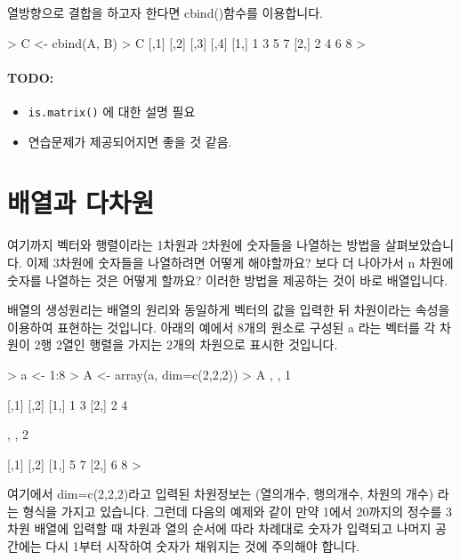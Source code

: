 \documentclass[tutorial.tex]{subfiles}
\begin{document}
열방향으로 결합을 하고자 한다면 cbind()함수를 이용합니다. 

\begin{Schunk}
\begin{Soutput}
> C <- cbind(A, B)
> C
     [,1] [,2] [,3] [,4]
[1,]    1    3    5    7
[2,]    2    4    6    8
> 
\end{Soutput}
\end{Schunk}

\paragraph{TODO:}
\begin{itemize}
	\item \texttt{is.matrix()} 에 대한 설명 필요
	\item 연습문제가 제공되어지면 좋을 것 같음. 
\end{itemize}

%
%
%

\section{배열과 다차원} 

여기까지 벡터와 행렬이라는 1차원과 2차원에 숫자들을 나열하는 방법을 살펴보았습니다.
이제 3차원에 숫자들을 나열하려면 어떻게 해야할까요? 
보다 더 나아가서 n 차원에 숫자를 나열하는 것은 어떻게 할까요?
이러한 방법을 제공하는 것이 바로 배열입니다. 

배열의 생성원리는 배열의 원리와 동일하게 벡터의 값을 입력한 뒤 차원이라는 속성을 이용하여 표현하는 것입니다.
아래의 예에서 8개의 원소로 구성된 a 라는 벡터를 각 차원이 2행 2열인 행렬을 가지는 2개의 차원으로 표시한 것입니다. 

\begin{Schunk}
\begin{Soutput}
> a <- 1:8
> A <- array(a, dim=c(2,2,2))
> A 
, , 1

     [,1] [,2]
[1,]    1    3
[2,]    2    4

, , 2

     [,1] [,2]
[1,]    5    7
[2,]    6    8
>
\end{Soutput}
\end{Schunk}

여기에서 dim=c(2,2,2)라고 입력된 차원정보는 (열의개수, 행의개수, 차원의 개수) 라는 형식을 가지고 있습니다. 
그런데 다음의 예제와 같이 만약 1에서 20까지의 정수를 3차원 배열에 입력할 때 차원과 열의 순서에 따라 차례대로 숫자가 입력되고 나머지 공간에는 다시 1부터 시작하여 숫자가 채워지는 것에 주의해야 합니다.
\end{document}
